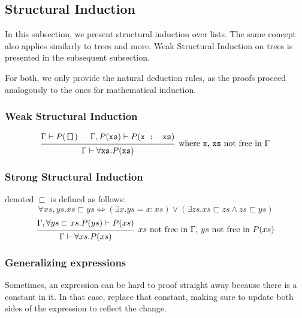 \subsection{Structural Induction}
In this subsection, we present structural induction over lists.
The same concept also applies similarly to trees and more.
Weak Structural Induction on trees is presented in the subsequent subsection.

For both, we only provide the natural deduction rules, as the proofs proceed analogously to the ones for mathematical induction.

\subsubsection{Weak Structural Induction}
\[
    \begin{prooftree}
        \hypo{\Gamma \vdash P(\texttt{[]})}
        \hypo{\Gamma, P(\texttt{xs}) \vdash P(\texttt{x : xs})}
        \infer2[where \texttt{x}, \texttt{xs} not free in $\Gamma$]{\Gamma \vdash \forall \texttt{xs} . P(\texttt{xs})}
    \end{prooftree}
\]

\subsubsection{Strong Structural Induction}
 denoted $\sqsubset$ is defined as follows:
\[
    \forall xs, ys . xs \sqsubset ys \Leftrightarrow (\exists x. ys = x:xs) \lor (\exists zs . xs \sqsubset zs \land zs \sqsubset ys)
\]
\begin{align*}
    \begin{prooftree}
        \hypo{\Gamma, \forall ys \sqsubset xs . P(ys) \vdash P(xs)}
        \infer1[$xs$ not free in $\Gamma$, $ys$ not free in $P(xs)$]{\Gamma \vdash \forall xs . P(xs)}
    \end{prooftree}
\end{align*}


\subsubsection{Generalizing expressions}
Sometimes, an expression can be hard to proof straight away because there is a constant in it.
In that case, replace that constant, making sure to update both sides of the expression to reflect the change.
